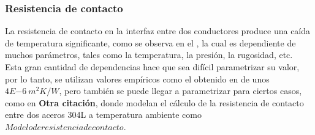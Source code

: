 \subsubsection{Resistencia de contacto}
La resistencia de contacto en la interfaz entre dos conductores produce una caída de temperatura significante, como se observa en el \cite{noauthor_parallel-plate_nodate}, la cual es dependiente de muchos parámetros, tales como la temperatura, la presión, la rugosidad, etc.\\

Esta gran cantidad de dependencias hace que sea difícil parametrizar su valor, por lo tanto, se utilizan valores empíricos como el obtenido en \cite{noauthor_parallel-plate_nodate} de unos $4E{-6} \ m^2K/W$, pero también se puede llegar a parametrizar para ciertos casos, como en \textbf{Otra citación}, donde modelan el cálculo de la resistencia de contacto entre dos aceros 304L a temperatura ambiente como $Modelo de resistencia de contacto$.
